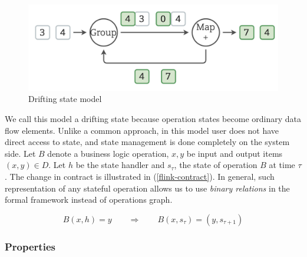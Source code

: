 \begin{figure}[htbp]
  \centering
  \includegraphics[width=\columnwidth]{pics/classical-drifting2}
  \caption{Drifting state model}
  \label {classical-drifting2}
\end{figure}

We call this model a drifting state because operation states become ordinary data flow elements. Unlike a common approach, in this model user does not have direct access to state, and state management is done completely on the system side. Let $B$ denote a business logic operation, $x, y$ be input and output items $(x,y)\in D$. Let $h$ be the state handler and $s_\tau$, the state of operation $B$ at time $\tau$. The change in contract is illustrated in (\ref{flink-contract}). In general, such representation of any stateful operation allows us to use {\em binary relations} in the formal framework instead of operations graph.

\begin{equation}
  \label{flink-contract}
  B(x, h) = y \qquad\Longrightarrow\qquad B(x, s_{\tau}) = (y, s_{\tau+1}) 
\end{equation}

\subsubsection{Properties}

